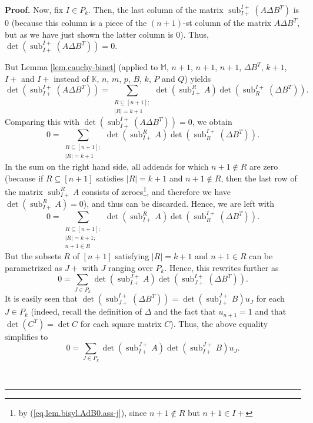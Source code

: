\documentclass[numbers=enddot,12pt,final,onecolumn,notitlepage]{scrartcl}%
\theoremstyle{definition}
\newenvironment{proof}[1][Proof]{\noindent\textbf{#1.} }{\ \rule{0.5em}{0.5em}}
\let\sumnonlimits\sum
\renewcommand{\sum}{\sumnonlimits\limits}
\newenvironment{vershort}{}{}
\begin{document}
\begin{proof}
Now, fix $I\in P_{k}$. Then, the last column of the matrix
$\operatorname*{sub}\nolimits_{I+}^{I+}\left(  A\Delta B^{T}\right)  $ is $0$
(because this column is a piece of the $\left(  n+1\right)  $-st column of the
matrix $A\Delta B^{T}$, but as we have just shown the latter column is $0$).
Thus, $\det\left(  \operatorname*{sub}\nolimits_{I+}^{I+}\left(  A\Delta
B^{T}\right)  \right)  =0$.

\begin{vershort}
But Lemma \ref{lem.cauchy-binet} (applied to $\mathbb{M}$, $n+1$, $n+1$,
$n+1$, $\Delta B^{T}$, $k+1$, $I+$ and $I+$ instead of $\mathbb{K}$, $n$, $m$,
$p$, $B$, $k$, $P$ and $Q$) yields%
\[
\det\left(  \operatorname*{sub}\nolimits_{I+}^{I+}\left(  A\Delta
B^{T}\right)  \right)  =\sum_{\substack{R\subseteq\left[  n+1\right]
;\\\left\vert R\right\vert =k+1}}\det\left(  \operatorname*{sub}%
\nolimits_{I+}^{R}A\right)  \det\left(  \operatorname*{sub}\nolimits_{R}%
^{I+}\left(  \Delta B^{T}\right)  \right)  .
\]
Comparing this with $\det\left(  \operatorname*{sub}\nolimits_{I+}^{I+}\left(
A\Delta B^{T}\right)  \right)  =0$, we obtain%
\[
0=\sum_{\substack{R\subseteq\left[  n+1\right]  ;\\\left\vert R\right\vert
=k+1}}\det\left(  \operatorname*{sub}\nolimits_{I+}^{R}A\right)  \det\left(
\operatorname*{sub}\nolimits_{R}^{I+}\left(  \Delta B^{T}\right)  \right)  .
\]
In the sum on the right hand side, all addends for which $n+1\notin R$ are
zero (because if $R\subseteq\left[  n+1\right]  $ satisfies $\left\vert
R\right\vert =k+1$ and $n+1\notin R$, then the last row of the matrix
$\operatorname*{sub}\nolimits_{I+}^{R}A$ consists of zeroes\footnote{by
(\ref{eq.lem.bisyl.AdB0.ass-j}), since $n+1\notin R$ but $n+1\in I+$}, and
therefore we have $\det\left(  \operatorname*{sub}\nolimits_{I+}^{R}A\right)
=0$), and thus can be discarded. Hence, we are left with%
\[
0=\sum_{\substack{R\subseteq\left[  n+1\right]  ;\\\left\vert R\right\vert
=k+1;\\n+1\in R}}\det\left(  \operatorname*{sub}\nolimits_{I+}^{R}A\right)
\det\left(  \operatorname*{sub}\nolimits_{R}^{I+}\left(  \Delta B^{T}\right)
\right)  .
\]
But the subsets $R$ of $\left[  n+1\right]  $ satisfying $\left\vert
R\right\vert =k+1$ and $n+1\in R$ can be parametrized as $J+$ with $J$ ranging
over $P_{k}$. Hence, this rewrites further as%
\[
0=\sum_{J\in P_{k}}\det\left(  \operatorname*{sub}\nolimits_{I+}^{J+}A\right)
\det\left(  \operatorname*{sub}\nolimits_{J+}^{I+}\left(  \Delta B^{T}\right)
\right)  .
\]
It is easily seen that $\det\left(  \operatorname*{sub}\nolimits_{J+}%
^{I+}\left(  \Delta B^{T}\right)  \right)  =\det\left(  \operatorname*{sub}%
\nolimits_{I+}^{J+}B\right)  u_{J}$ for each $J\in P_{k}$ (indeed, recall the
definition of $\Delta$ and the fact that $u_{n+1}=1$ and that $\det\left(
C^{T}\right)  =\det C$ for each square matrix $C$). Thus, the above equality
simplifies to
\[
0=\sum_{J\in P_{k}}\det\left(  \operatorname*{sub}\nolimits_{I+}^{J+}A\right)
\det\left(  \operatorname*{sub}\nolimits_{I+}^{J+}B\right)  u_{J}.
\]


\end{vershort}
\end{proof}
\end{document}
